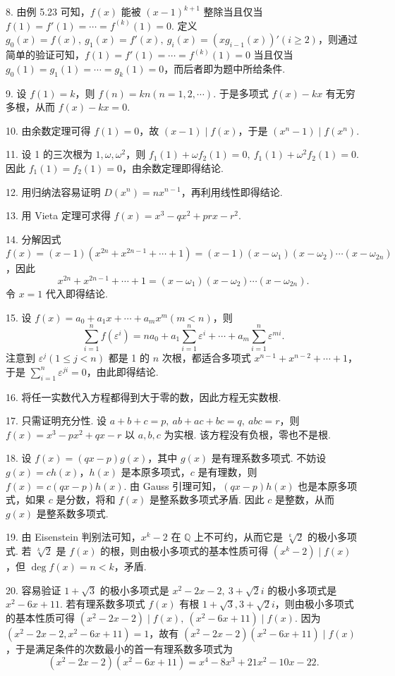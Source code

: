 \documentclass[UTF8,12pt,a4paper,fontset=fandol]{ctexart}
\begin{document}
8. 由例 5.23 可知，$f(x)$ 能被 $(x-1)^{k+1}$ 整除当且仅当 $f(1)=f'(1)=\cdots=f^{(k)}(1)=0$. 定义 $g_0(x)=f(x),\ g_1(x)=f'(x),\ g_i(x)=(xg_{i-1}(x))'(i\ge2)$，则通过简单的验证可知，$f(1)=f'(1)=\cdots=f^{(k)}(1)=0$ 当且仅当 $g_0(1)=g_1(1)=\cdots=g_k(1)=0$，而后者即为题中所给条件.

9. 设 $f(1)=k$，则 $f(n)=kn(n=1,2,\cdots)$. 于是多项式 $f(x)-kx$ 有无穷多根，从而 $f(x)-kx=0$.

10. 由余数定理可得 $f(1)=0$，故 $(x-1)\mid f(x)$，于是 $(x^n-1)\mid f(x^n)$.

11. 设 1 的三次根为 $1,\omega,\omega^2$，则 $f_1(1)+\omega f_2(1)=0,\ f_1(1)+\omega^2f_2(1)=0$. 因此 $f_1(1)=f_2(1)=0$，由余数定理即得结论.

12. 用归纳法容易证明 $D(x^n)=nx^{n-1}$，再利用线性即得结论.

13. 用 Vieta 定理可求得 $f(x)=x^3-qx^2+prx-r^2$.

14. 分解因式 $f(x)=(x-1)(x^{2n}+x^{2n-1}+\cdots+1)=(x-1)(x-\omega_1)(x-\omega_2)\cdots(x-\omega_{2n})$，因此
\[
x^{2n}+x^{2n-1}+\cdots+1=(x-\omega_1)(x-\omega_2)\cdots(x-\omega_{2n}).
\]
令 $x=1$ 代入即得结论.

15. 设 $f(x)=a_0+a_1x+\cdots+a_mx^m(m<n)$，则
\[
\sum_{i=1}^n f(\varepsilon^i)=na_0+a_1\sum_{i=1}^n\varepsilon^i+\cdots+a_m\sum_{i=1}^n\varepsilon^{mi}.
\]
注意到 $\varepsilon^j(1\le j<n)$ 都是 1 的 $n$ 次根，都适合多项式 $x^{n-1}+x^{n-2}+\cdots+1$，于是 $\sum_{i=1}^n\varepsilon^{ji}=0$，由此即得结论.

16. 将任一实数代入方程都得到大于零的数，因此方程无实数根.

17. 只需证明充分性. 设 $a+b+c=p,\ ab+ac+bc=q,\ abc=r$，则 $f(x)=x^3-px^2+qx-r$ 以 $a,b,c$ 为实根. 该方程没有负根，零也不是根.

18. 设 $f(x)=(qx-p)g(x)$，其中 $g(x)$ 是有理系数多项式. 不妨设 $g(x)=ch(x)$，$h(x)$ 是本原多项式，$c$ 是有理数，则 $f(x)=c(qx-p)h(x)$. 由 Gauss 引理可知，$(qx-p)h(x)$ 也是本原多项式，如果 $c$ 是分数，将和 $f(x)$ 是整系数多项式矛盾. 因此 $c$ 是整数，从而 $g(x)$ 是整系数多项式.

19. 由 Eisenstein 判别法可知，$x^k-2$ 在 $\mathbb{Q}$ 上不可约，从而它是 $\sqrt[k]{2}$ 的极小多项式. 若 $\sqrt[k]{2}$ 是 $f(x)$ 的根，则由极小多项式的基本性质可得 $(x^k-2)\mid f(x)$，但 $\deg f(x)=n<k$，矛盾.

20. 容易验证 $1+\sqrt{3}$ 的极小多项式是 $x^2-2x-2,\ 3+\sqrt{2}i$ 的极小多项式是 $x^2-6x+11$. 若有理系数多项式 $f(x)$ 有根 $1+\sqrt{3},3+\sqrt{2}i$，则由极小多项式的基本性质可得 $(x^2-2x-2)\mid f(x),\ (x^2-6x+11)\mid f(x)$. 因为 $(x^2-2x-2,x^2-6x+11)=1$，故有 $(x^2-2x-2)(x^2-6x+11)\mid f(x)$，于是满足条件的次数最小的首一有理系数多项式为
\[
(x^2-2x-2)(x^2-6x+11)=x^4-8x^3+21x^2-10x-22.
\]
\end{document}
